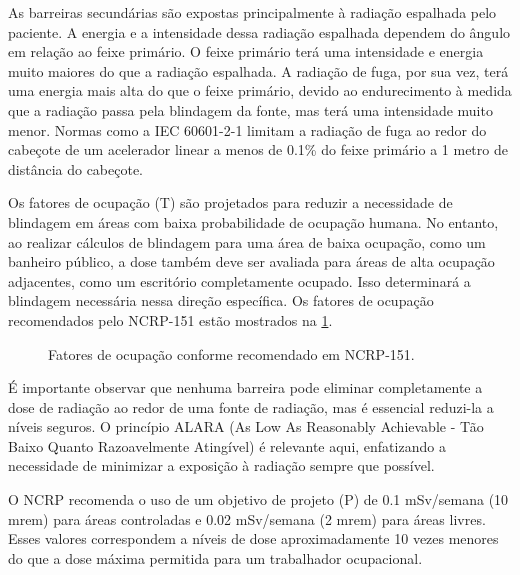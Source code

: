 \documentclass[11pt,a4paper]{article}
\begin{document}
	As barreiras secundárias são expostas principalmente à radiação espalhada pelo paciente. A energia e a intensidade dessa radiação espalhada dependem do ângulo em relação ao feixe primário. O feixe primário terá uma intensidade e energia muito maiores do que a radiação espalhada. A radiação de fuga, por sua vez, terá uma energia mais alta do que o feixe primário, devido ao endurecimento à medida que a radiação passa pela blindagem da fonte, mas terá uma intensidade muito menor. Normas como a IEC 60601-2-1 limitam a radiação de fuga ao redor do cabeçote de um acelerador linear a menos de 0.1\% do feixe primário a 1 metro de distância do cabeçote.

	Os fatores de ocupação (T) são projetados para reduzir a necessidade de blindagem em áreas com baixa probabilidade de ocupação humana. No entanto, ao realizar cálculos de blindagem para uma área de baixa ocupação, como um banheiro público, a dose também deve ser avaliada para áreas de alta ocupação adjacentes, como um escritório completamente ocupado. Isso determinará a blindagem necessária nessa direção específica. Os fatores de ocupação recomendados pelo NCRP-151 estão mostrados na \ref{fig:prFatorOcupacao}.

	\begin{figure}[!h]
		\centering
		\caption{Fatores de ocupação conforme recomendado em NCRP-151.}
		\label{fig:prFatorOcupacao}
	\end{figure}

	É importante observar que nenhuma barreira pode eliminar completamente a dose de radiação ao redor de uma fonte de radiação, mas é essencial reduzi-la a níveis seguros. O princípio ALARA (As Low As Reasonably Achievable - Tão Baixo Quanto Razoavelmente Atingível) é relevante aqui, enfatizando a necessidade de minimizar a exposição à radiação sempre que possível. 
	
	O NCRP recomenda o uso de um objetivo de projeto (P) de 0.1 mSv/semana (10 mrem) para áreas controladas e 0.02 mSv/semana (2 mrem) para áreas livres. Esses valores correspondem a níveis de dose aproximadamente 10 vezes menores do que a dose máxima permitida para um trabalhador ocupacional.
\end{document}
